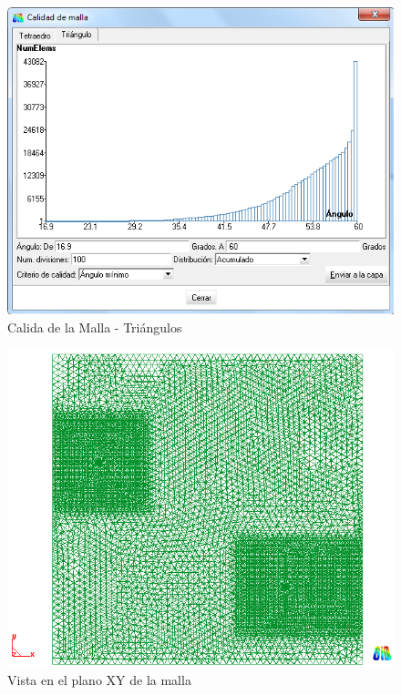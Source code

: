 \documentclass[10pt,a4paper,final]{article}
\begin{document}
\begin{figure}[tbhp]
\centerline{\includegraphics[scale=0.60]{img/cant_triangulos}}
\caption{Calida de la Malla - Triángulos}
\label{calidadtriangulos}
\end{figure}

\begin{figure}[tbhp]
\centerline{\includegraphics[scale=0.75]{img/contorno_malla_xy}}
\caption{Vista en el plano XY de la malla}
\label{contorno_malla_xy}
\end{figure}

\end{document}
